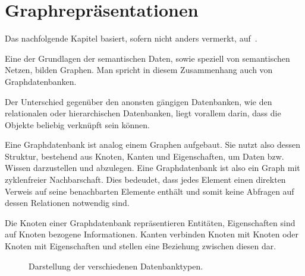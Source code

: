 \chapter{Graphrepräsentationen}
\label{chap:graph_data}

Das nachfolgende Kapitel basiert, sofern nicht anders vermerkt, auf~\cite{linkeddatatools}.

Eine der Grundlagen der semantischen Daten, sowie speziell von semantischen Netzen, bilden Graphen. Man spricht in diesem Zusammenhang auch von Graphdatenbanken.

Der Unterschied gegenüber den anonsten gängigen Datenbanken, wie den relationalen oder hierarchischen Datenbanken, liegt vorallem darin, dass die Objekte beliebig verknüpft sein können.

Eine Graphdatenbank ist analog einem Graphen aufgebaut. Sie nutzt also dessen Struktur, bestehend aus Knoten, Kanten und Eigenschaften, um Daten bzw. Wissen darzustellen und abzulegen. Eine Graphdatenbank ist also ein Graph mit zyklenfreier Nachbarschaft. Dies bedeudet, dass jedes Element einen direkten Verweis auf seine benachbarten Elemente enthält und somit keine Abfragen auf dessen Relationen notwendig sind.

Die Knoten einer Graphdatenbank repräsentieren Entitäten, Eigenschaften sind auf Knoten bezogene Informationen. Kanten verbinden Knoten mit Knoten oder Knoten mit Eigenschaften und stellen eine Beziehung zwischen diesen dar.

\begin{figure}[htbp]
\centering {}
\caption{Darstellung der verschiedenen Datenbanktypen.\label{fig:datenbanktypen}\protect\footnotemark}
\end{figure}

